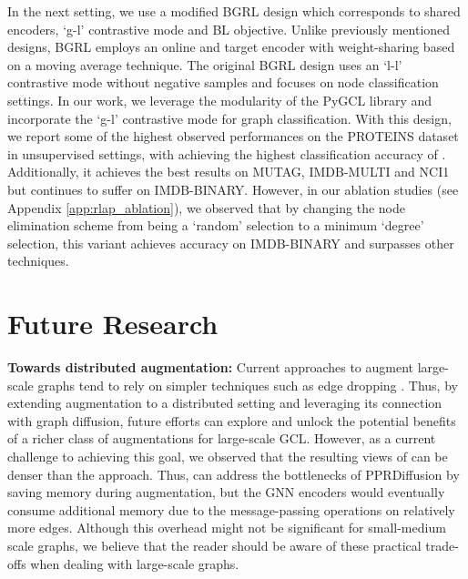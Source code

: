 \documentclass{article}
\theoremstyle{plain}
\theoremstyle{definition}
\theoremstyle{remark}
\begin{document}
In the next setting, we use a modified BGRL design which corresponds to shared encoders, `g-l' contrastive mode and BL objective. Unlike previously mentioned designs, BGRL employs an online and target encoder with weight-sharing based on a moving average technique. The original BGRL design \citep{thakoor2021bootstrapped} uses an `l-l' contrastive mode without negative samples and focuses on node classification settings. In our work, we leverage the modularity of the PyGCL library and incorporate the `g-l' contrastive mode for graph classification. With this design, we report some of the highest observed performances on the PROTEINS dataset in unsupervised settings, with  achieving the highest classification accuracy of . Additionally, it achieves the best results on MUTAG, IMDB-MULTI and NCI1 but continues to suffer on IMDB-BINARY. However, in our ablation studies (see Appendix \ref{app:rlap_ablation}), we observed that by changing the node elimination scheme from being a `random' selection to a minimum `degree' selection, this  variant achieves  accuracy on IMDB-BINARY and surpasses other techniques.

\section{Future Research}

\textbf{ Towards distributed augmentation:} Current approaches to augment large-scale graphs tend to rely on  simpler techniques such as edge dropping \cite{thakoor2021bootstrapped}. Thus, by extending  augmentation to a distributed setting and leveraging its connection with graph diffusion, future efforts can explore and unlock the potential benefits of a richer class of augmentations for large-scale GCL. However, as a current challenge to achieving this goal, we observed that the resulting views of  can be denser than the  approach. Thus,  can address the bottlenecks of PPRDiffusion by saving memory during augmentation, but the GNN encoders would eventually consume additional memory due to the message-passing operations on relatively more edges. Although this overhead might not be significant for small-medium scale graphs, we believe that the reader should be aware of these practical trade-offs when dealing with large-scale graphs.
\end{document}
